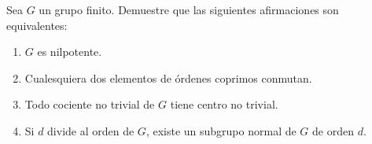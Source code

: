 
\begin{exercise}
	Sea $G$ un grupo finito. Demuestre que las siguientes afirmaciones son
	equivalentes: 
	\begin{enumerate}
		\item $G$ es nilpotente.
		\item Cualesquiera dos elementos de órdenes coprimos conmutan. 
		\item Todo cociente no trivial de $G$ tiene centro no trivial.
		\item Si $d$ divide al orden de $G$, existe un subgrupo normal de $G$
			de orden $d$.
	\end{enumerate}
\end{exercise}


